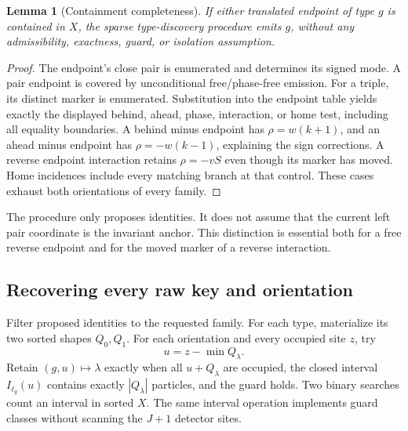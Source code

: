 \documentclass[11pt,a4paper]{article}
\numberwithin{equation}{section}
\newtheorem{lemma}[theorem]{Lemma}
\begin{document}
\begin{lemma}[Containment completeness]\label{fpa:sp:lem:discovery}
If either translated endpoint of type $g$ is contained in $X$, the sparse type-discovery procedure emits $g$, without any admissibility, exactness, guard, or isolation assumption.
\end{lemma}
\begin{proof}
The endpoint's close pair is enumerated and determines its signed mode. A pair endpoint is covered by unconditional free/phase-free emission. For a triple, its distinct marker is enumerated. Substitution into the endpoint table yields exactly the displayed behind, ahead, phase, interaction, or home test, including all equality boundaries. A behind minus endpoint has $\rho=w(k+1)$, and an ahead minus endpoint has $\rho=-w(k-1)$, explaining the sign corrections. A reverse endpoint interaction retains $\rho=-vS$ even though its marker has moved. Home incidences include every matching branch at that control. These cases exhaust both orientations of every family.
\end{proof}

The procedure only proposes identities. It does not assume that the current left pair coordinate is the invariant anchor. This distinction is essential both for a free reverse endpoint and for the moved marker of a reverse interaction.

\subsection{Recovering every raw key and orientation}
Filter proposed identities to the requested family. For each type, materialize its two sorted shapes $Q_0,Q_1$. For each orientation and every occupied site $z$, try
\[
u=z-\min Q_\lambda.
\]
Retain $(g,u)\mapsto\lambda$ exactly when all $u+Q_\lambda$ are occupied, the closed interval $I_{\ell_g}(u)$ contains exactly $|Q_\lambda|$ particles, and the guard holds. Two binary searches count an interval in sorted $X$. The same interval operation implements guard classes without scanning the $J+1$ detector sites.
\end{document}
